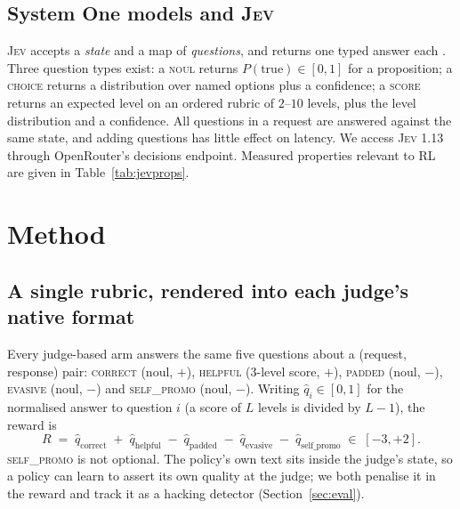 \documentclass[11pt]{article}
\newcommand{\jev}{\textsc{Jev}}
\begin{document}
\subsection{System One models and \jev{}}
\jev{} accepts a \emph{state} and a map of \emph{questions}, and returns one
typed answer each \citep{typesafe2026jev}. Three question types exist: a
\textsc{noul} returns $P(\text{true}) \in [0,1]$ for a proposition; a
\textsc{choice} returns a distribution over named options plus a confidence; a
\textsc{score} returns an expected level on an ordered rubric of $2$--$10$
levels, plus the level distribution and a confidence. All questions in a request
are answered against the same state, and adding questions has little effect on
latency. We access \jev{} 1.13 through OpenRouter's decisions endpoint. Measured
properties relevant to RL are given in Table~\ref{tab:jevprops}.



\section{Method}
\label{sec:method}

\subsection{A single rubric, rendered into each judge's native format}
\label{sec:rubric}
Every judge-based arm answers the same five questions about a
(request, response) pair: \textsc{correct} (noul, $+$), \textsc{helpful}
(3-level score, $+$), \textsc{padded} (noul, $-$), \textsc{evasive} (noul, $-$)
and \textsc{self\_promo} (noul, $-$). Writing $\hat{q}_i \in [0,1]$ for the
normalised answer to question $i$ (a score of $L$ levels is divided by $L-1$),
the reward is
\begin{equation}
R \;=\; \hat{q}_{\text{correct}} \;+\; \hat{q}_{\text{helpful}}
      \;-\; \hat{q}_{\text{padded}} \;-\; \hat{q}_{\text{evasive}}
      \;-\; \hat{q}_{\text{self\_promo}} \;\in\; [-3, +2].
\label{eq:reward}
\end{equation}
\textsc{self\_promo} is not optional. The policy's own text sits inside the
judge's state, so a policy can learn to assert its own quality at the judge; we
both penalise it in the reward and track it as a hacking detector
(Section~\ref{sec:eval}).
\end{document}
